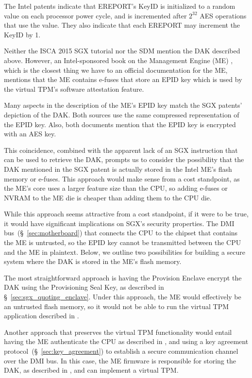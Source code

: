 The Intel patents indicate that EREPORT's KeyID is initialized to a random
value on each processor power cycle, and is incremented after $2^{32}$ AES
operations that use the value. They also indicate that each EREPORT may
increment the KeyID by 1.




Neither the ISCA 2015 SGX tutorial nor the SDM mention the DAK described above.
However, an Intel-sponsored book on the Management Engine (ME)
\cite{ruan2014intelme}, which is the closest thing we have to an official
documentation for the ME, mentions that the ME contains e-fuses that store an
EPID key which is used by the virtual TPM's software attestation feature.

Many aspects in the description of the ME's EPID key match the SGX patents'
depiction of the DAK. Both sources use the same compressed representation of
the EPID key. Also, both documents mention that the EPID key is encrypted with
an AES key.

This coincidence, combined with the apparent lack of an SGX instruction that
can be used to retrieve the DAK, prompts us to consider the possibility that
the DAK mentioned in the SGX patent is actually stored in the Intel ME's flash
memory or e-fuses. This approach would make sense from a cost standpoint, as
the ME's core uses a larger feature size than the CPU, so adding e-fuses or
NVRAM to the ME die is cheaper than adding them to the CPU die.

While this approach seems attractive from a cost standpoint, if it were to be
true, it would have significant implications on SGX's security properties. The
DMI bus~(\S~\ref{sec:motherboard}) that connects the CPU to the chipset that
contains the ME is untrusted, so the EPID key cannot be transmitted between the
CPU and the ME in plaintext. Below, we outline two possibilities for building a
secure system where the DAK is stored in the ME's flash memory.

The most straightforward approach is having the Provision Enclave encrypt the
DAK using the Provisioning Seal Key, as described in
\S~\ref{sec:sgx_quoting_enclave}. Under this approach, the ME would effectively
be an untrusted flash memory, so it would not be able to run the virtual TPM
application described in \cite{ruan2014intelme}.

Another approach that preserves the virtual TPM functionality would entail
having the ME authenticate the CPU as described in \cite{costan2011spchip}, and
using a key agreement protocol~(\S~\ref{sec:key_agreement}) to establish a
secure communication channel over the DMI bus. In this case, the ME firmware is
responsible for storing the DAK, as described in \cite{ruan2014intelme}, and
can implement a virtual TPM.

